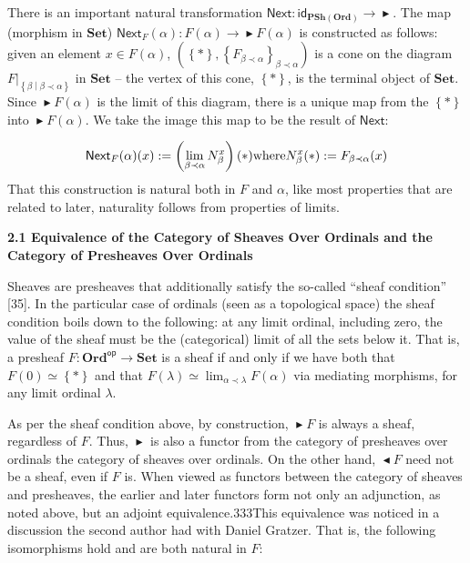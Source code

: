 There is an important natural transformation $\mathsf{Next}{}:{}\mathsf{id}_{\mathbf{PSh}(\mathbf{Ord})}\to\mathop{\blacktriangleright}$. The map (morphism in $\mathbf{Set}$) $\mathsf{Next}_{F}(\alpha):F(\alpha)\to\mathop{\blacktriangleright}F(\alpha)$ is constructed as follows: given an element $x\in F(\alpha)$, $(\left\{*\right\},\left\{F_{\beta\prec\alpha}\right\}_{\beta\prec\alpha})$ is a cone on the diagram ${\left.F\right|}_{\left\{\beta\middle|\beta\prec\alpha\right\}}$ in $\mathbf{Set}$ – the vertex of this cone, $\left\{*\right\}$, is the terminal object of $\mathbf{Set}$. Since $\mathop{\blacktriangleright}F(\alpha)$ is the limit of this diagram, there is a unique map from the $\left\{*\right\}$ into $\mathop{\blacktriangleright}F(\alpha)$. We take the image this map to be the result of $\mathsf{Next}$:\par
    \[\mathsf{Next}_{F}(\alpha)(x):=\left(\lim_{\beta\prec\alpha}N^{x}_{\beta}\right)(*)\hfill\text{where}\hfill N^{x}_{\beta}(*):=F_{\beta\prec\alpha}(x)\hfill\]    
That this construction is natural both in $F$ and $\alpha$, like most properties that are related to later, naturality follows from properties of limits.\par
 
  
 
\par\medskip\noindent\textbf{2.1 Equivalence of the Category of Sheaves Over Ordinals and the Category of Presheaves Over Ordinals}\par
 
 
Sheaves are presheaves that additionally satisfy the so-called “sheaf condition” [35]. In the particular case of ordinals (seen as a topological space) the sheaf condition boils down to the following: at any limit ordinal, including zero, the value of the sheaf must be the (categorical) limit of all the sets below it. That is, a presheaf $F{}:{\mathbf{Ord}}^{\mathsf{op}}\to\mathbf{Set}{}$ is a sheaf if and only if we have both that $F(0)\simeq\left\{*\right\}$ and that $F(\lambda)\simeq\lim_{\alpha\prec\lambda}F(\alpha)$ via mediating morphisms, for any limit ordinal $\lambda$.\par
 
 
 
As per the sheaf condition above, by construction, $\mathop{\blacktriangleright}F$ is always a sheaf, regardless of $F$. Thus, $\mathop{\blacktriangleright}$ is also a functor from the category of presheaves over ordinals the category of sheaves over ordinals. On the other hand, $\mathop{\blacktriangleleft}F$ need not be a sheaf, even if $F$ is. When viewed as functors between the category of sheaves and presheaves, the earlier and later functors form not only an adjunction, as noted above, but an adjoint equivalence.333This equivalence was noticed in a discussion the second author had with Daniel Gratzer. That is, the following isomorphisms hold and are both natural in $F$:\par
 
